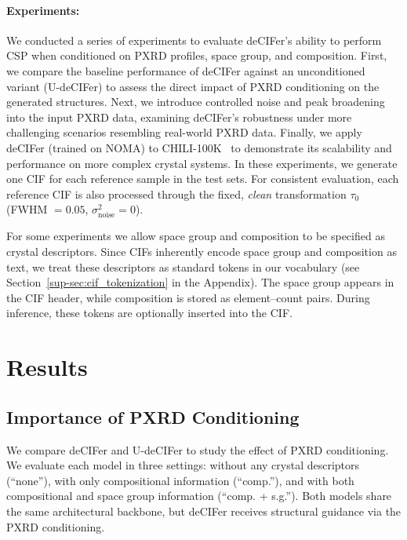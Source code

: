 \paragraph{Experiments:} We conducted a series of experiments to evaluate deCIFer's ability to perform CSP when conditioned on PXRD profiles, space group, and composition. First, we compare the baseline performance of deCIFer against an unconditioned variant (U-deCIFer) to assess the direct impact of PXRD conditioning on the generated structures. Next, we introduce controlled noise and peak broadening into the input PXRD data, examining deCIFer's robustness under more challenging scenarios resembling real-world PXRD data. Finally, we apply deCIFer (trained on NOMA) to CHILI-100K~\cite{FriisJensenJohansen2024} to demonstrate its scalability and performance on more complex crystal systems. In these experiments, we generate one CIF for each reference sample in the test sets. For consistent evaluation, each reference CIF is also processed through the fixed, \textit{clean} transformation $\tau_0$ (FWHM $= 0.05$, $\sigma_{\mathrm{noise}}^2 = 0$).

For some experiments we allow space group and composition to be specified as crystal descriptors. Since CIFs inherently encode space group and composition as text, we treat these descriptors as standard tokens in our vocabulary (see Section~\ref{sup-sec:cif_tokenization} in the Appendix). The space group appears in the CIF header, while composition is stored as element–count pairs. During inference, these tokens are optionally inserted into the CIF.

\section{Results}
\label{sec:results}

\subsection{Importance of PXRD Conditioning}

We compare deCIFer and U-deCIFer to study the effect of PXRD conditioning. We evaluate each model in three settings: without any crystal descriptors (``none''), with only compositional information (``comp.''), and with both compositional and space group information (``comp. + s.g.''). Both models share the same architectural backbone, but deCIFer receives structural guidance via the PXRD conditioning. 

